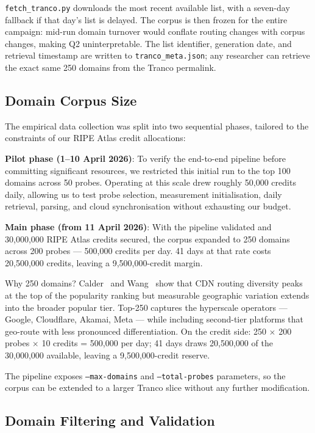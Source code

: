 \texttt{fetch\_tranco.py} downloads the most recent available list, with a seven-day fallback if that day's list is delayed. The corpus is then frozen for the entire campaign: mid-run domain turnover would conflate routing changes with corpus changes, making Q2 uninterpretable. The list identifier, generation date, and retrieval timestamp are written to \texttt{tranco\_meta.json}; any researcher can retrieve the exact same 250 domains from the Tranco permalink.

\subsection{Domain Corpus Size}
\label{subsec:3.2.2}

The empirical data collection was split into two sequential phases, tailored to the constraints of our RIPE Atlas credit allocations:

\textbf{Pilot phase (1--10 April 2026)}: To verify the end-to-end pipeline before committing significant resources, we restricted this initial run to the top 100 domains across 50 probes. Operating at this scale drew roughly 50,000 credits daily, allowing us to test probe selection, measurement initialisation, daily retrieval, parsing, and cloud synchronisation without exhausting our budget.

\textbf{Main phase (from 11 April 2026)}: With the pipeline validated and 30,000,000 RIPE Atlas credits secured, the corpus expanded to 250 domains across 200 probes --- 500,000 credits per day. 41 days at that rate costs 20,500,000 credits, leaving a 9,500,000-credit margin.

Why 250 domains? Calder~\cite{Calder2015} and Wang~\cite{Wang2018} show that \ac{CDN} routing diversity peaks at the top of the popularity ranking but measurable geographic variation extends into the broader popular tier. Top-250 captures the hyperscale operators --- Google, Cloudflare, Akamai, Meta --- while including second-tier platforms that geo-route with less pronounced differentiation. On the credit side: 250 $\times$ 200 probes $\times$ 10 credits = 500,000 per day; 41 days draws 20,500,000 of the 30,000,000 available, leaving a 9,500,000-credit reserve.

The pipeline exposes \texttt{--max-domains} and \texttt{--total-probes} parameters, so the corpus can be extended to a larger Tranco slice without any further modification.

\subsection{Domain Filtering and Validation}
\label{subsec:3.2.3}

